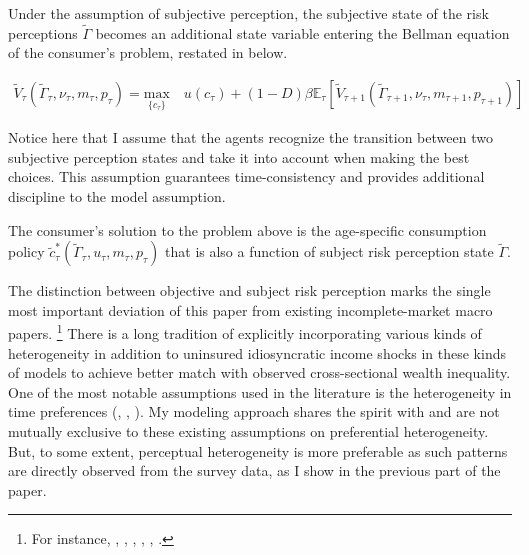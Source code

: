 Under the assumption of subjective perception, the subjective state of the risk perceptions $\tilde \Gamma$ becomes an additional state variable entering the Bellman equation of the consumer's problem, restated in below.

\begin{equation}
\begin{split}
\tilde V_{\tau}(\tilde \Gamma_\tau, \nu_\tau, m_\tau, p_\tau) = \underset{\{c_\tau\}}{\textrm{max}} \quad u(c_\tau) + (1-D)\beta \mathbb{E}_{\tau}\left[\tilde V_{\tau+1}(\tilde \Gamma_{\tau+1}, \nu_\tau,m_{\tau+1}, p_{\tau+1})\right] 
\end{split}
\end{equation}

Notice here that I assume that the agents recognize the transition between two subjective perception states and take it into account when making the best choices. This assumption guarantees time-consistency and provides additional discipline to the model assumption.  

The consumer's solution to the problem above is the age-specific consumption policy $\tilde c_\tau^*(\tilde \Gamma_\tau,u_\tau, m_\tau,p_\tau)$ that is also a function of subject risk perception state $\tilde \Gamma$.

The distinction between objective and subject risk perception marks the single most important deviation of this paper from existing incomplete-market macro papers. \footnote{For instance, \cite{bewley1976permanent}, \cite{huggett1993risk}, \cite{aiyagari1994uninsured}, \cite{krusell1998income},  \cite{krueger2016macroeconomics},  \cite{carroll2017distribution}.} There is a long tradition of explicitly incorporating various kinds of heterogeneity in addition to uninsured idiosyncratic income shocks in these kinds of models to achieve better match with observed cross-sectional wealth inequality. One of the most notable assumptions used in the literature is the heterogeneity in time preferences (\cite{krusell1998income}, \cite{carroll2017distribution}, \cite{krueger2016macroeconomics}). My modeling approach shares the spirit with and are not mutually exclusive to these existing assumptions on preferential heterogeneity. But, to some extent, perceptual heterogeneity is more preferable as such patterns are directly observed from the survey data, as I show in the previous part of the paper.  


